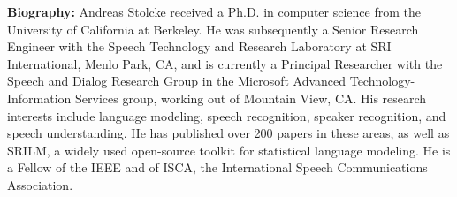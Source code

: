 \vspace{3em}

\vfill{}
\noindent \textbf{Biography:}  
 Andreas Stolcke received a Ph.D. in computer science from the University of California at Berkeley. He was subsequently a Senior Research Engineer with the Speech Technology and Research Laboratory at SRI International, Menlo Park, CA, and is currently a Principal Researcher with the Speech and Dialog Research Group in the Microsoft Advanced Technology-Information Services group, working out of Mountain View, CA. His research interests include language modeling, speech recognition, speaker recognition, and speech understanding. He has published over 200 papers in these areas, as well as SRILM, a widely used open-source toolkit for statistical language modeling. He is a Fellow of the IEEE and of ISCA, the International Speech Communications Association. 
\clearpage{}








